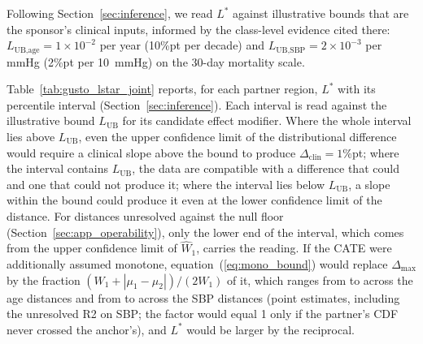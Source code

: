 \documentclass[AMA,Times1COL]{WileyNJDv5}
\begin{document}
Following Section~\ref{sec:inference}, we read $L^*$ against illustrative bounds that are the sponsor's clinical inputs, informed by the class-level evidence cited there: $L_{\text{UB,age}} = 1\times10^{-2}$ per year (10\%pt per decade) and $L_{\text{UB,SBP}} = 2\times10^{-3}$ per mmHg (2\%pt per 10~mmHg) on the 30-day mortality scale.

Table~\ref{tab:gusto_lstar_joint} reports, for each partner region, $L^*$ with its percentile interval (Section~\ref{sec:inference}). Each interval is read against the illustrative bound $L_{\text{UB}}$ for its candidate effect modifier. Where the whole interval lies above $L_{\text{UB}}$, even the upper confidence limit of the distributional difference would require a clinical slope above the bound to produce $\Delta_{\text{clin}} = 1$\%pt; where the interval contains $L_{\text{UB}}$, the data are compatible with a difference that could and one that could not produce it; where the interval lies below $L_{\text{UB}}$, a slope within the bound could produce it even at the lower confidence limit of the distance. For distances unresolved against the null floor (Section~\ref{sec:app_operability}), only the lower end of the interval, which comes from the upper confidence limit of $\widehat{W}_1$, carries the reading. If the CATE were additionally assumed monotone, equation~(\ref{eq:mono_bound}) would replace $\Delta_{\max}$ by the fraction $(W_1 + |\mu_1 - \mu_2|)/(2 W_1)$ of it, which ranges from  to  across the age distances and from  to  across the SBP distances (point estimates, including the unresolved R2 on SBP; the factor would equal 1 only if the partner's CDF never crossed the anchor's), and $L^*$ would be larger by the reciprocal.
\end{document}
